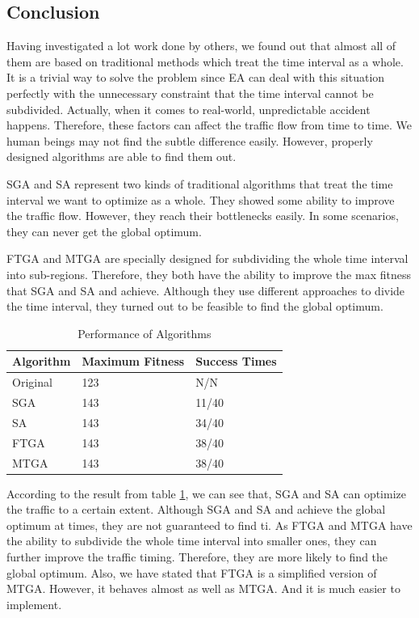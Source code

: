 \documentclass{article} %
\begin{document}
\subsection{Conclusion}
Having investigated a lot work done by others, we found out that almost all of them are based on traditional methods which treat the time interval as a whole. It is a trivial way to solve the problem since EA can deal with this situation perfectly with the unnecessary constraint that the time interval cannot be subdivided. Actually, when it comes to real-world, unpredictable accident happens. Therefore, these factors can affect the traffic flow from time to time. We human beings may not find the subtle difference easily. However, properly designed algorithms are able to find them out.

SGA and SA represent two kinds of traditional algorithms that treat the time interval we want to optimize as a whole. They showed some ability to improve the traffic flow. However, they reach their bottlenecks easily. In some scenarios, they can never get the global optimum. 

FTGA and MTGA are specially designed for subdividing the whole time interval into sub-regions. Therefore, they both have the ability to improve the max fitness that SGA and SA and achieve. Although they use different approaches to divide the time interval, they turned out to be feasible to find the global optimum. 

\begin{table}
\centering
\renewcommand\arraystretch{2}
    \begin{tabular}{|l|l|l|}
    \hline
    \textbf{Algorithm} & \textbf{Maximum Fitness} & \textbf{Success Times} \\ \hline
    Original  & 123             & N/N             \\ \hline
    SGA       & 143             & 11/40           \\ \hline
    SA        & 143             & 34/40           \\ \hline
    FTGA      & 143             & 38/40           \\ \hline
    MTGA      & 143             & 38/40           \\ \hline
    \end{tabular}
    \caption {Performance of Algorithms}
    \label{tab:pa}
\end{table}

According to the result from table \ref{tab:pa}, we can see that, SGA and SA can optimize the traffic to a certain extent. Although SGA and SA and achieve the global optimum at times, they are not guaranteed to find ti. As FTGA and MTGA have the ability to subdivide the whole time interval into smaller ones, they can further improve the traffic timing. Therefore, they are more likely to find the global optimum. Also, we have stated that FTGA is a simplified version of MTGA. However, it behaves almost as well as MTGA. And it is much easier to implement.
\end{document}
